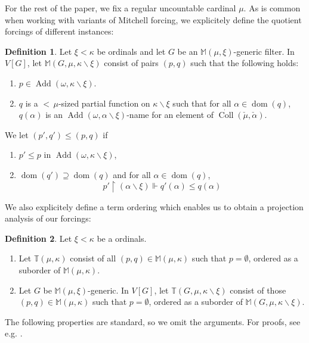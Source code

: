 \documentclass[a4paper]{amsart}
\theoremstyle{definition}
\newtheorem{mydef}{Definition}[section]
\theoremstyle{remark}
\theoremstyle{plain}
\numberwithin{mydef}{section}
\DeclareMathOperator{\dom}{dom}
\DeclareMathOperator{\Add}{Add}
\DeclareMathOperator{\Coll}{Coll}
\newcommand{\dM}{\mathbb{M}}
\newcommand{\dT}{\mathbb{T}}
\newcommand{\uhr}{\upharpoonright}
\begin{document}
	For the rest of the paper, we fix a regular uncountable cardinal $\mu$. As is common when working with variants of Mitchell forcing, we explicitely define the quotient forcings of different instances:
	
	\begin{mydef}
		Let $\xi<\kappa$ be ordinals and let $G$ be an $\dM(\mu,\xi)$-generic filter. In $V[G]$, let $\dM(G,\mu,\kappa\smallsetminus\xi)$ consist of pairs $(p,q)$ such that the following holds:
		\begin{enumerate}
			\item $p\in\Add(\omega,\kappa\smallsetminus\xi)$.
			\item $q$ is a ${<}\,\mu$-sized partial function on $\kappa\smallsetminus\xi$ such that for all $\alpha\in\dom(q)$, $q(\alpha)$ is an $\Add(\omega,\alpha\smallsetminus\xi)$-name for an element of $\dot{\Coll}(\check{\mu},\check{\alpha})$.
		\end{enumerate}
		We let $(p',q')\leq(p,q)$ if
		\begin{enumerate}
			\item $p'\leq p$ in $\Add(\omega,\kappa\smallsetminus\xi)$,
			\item $\dom(q')\supseteq\dom(q)$ and for all $\alpha\in\dom(q)$,
			$$p'\uhr(\alpha\smallsetminus\xi)\Vdash q'(\alpha)\leq q(\alpha)$$
		\end{enumerate}
	\end{mydef}
	
	We also explicitely define a term ordering which enables us to obtain a projection analysis of our forcings:
	
	\begin{mydef}
		Let $\xi<\kappa$ be a ordinals.
		\begin{enumerate}
			\item Let $\dT(\mu,\kappa)$ consist of all $(p,q)\in\dM(\mu,\kappa)$ such that $p=\emptyset$, ordered as a suborder of $\dM(\mu,\kappa)$.
			\item Let $G$ be $\dM(\mu,\xi)$-generic. In $V[G]$, let $\dT(G,\mu,\kappa\smallsetminus\xi)$ consist of those $(p,q)\in\dM(\mu,\kappa)$ such that $p=\emptyset$, ordered as a suborder of $\dM(G,\mu,\kappa\smallsetminus\xi)$.
		\end{enumerate}
	\end{mydef}
	
	The following properties are standard, so we omit the arguments. For proofs, see e.g. \cite[Section 2]{LevineDisjointStatSeq}.
	
\end{document}
